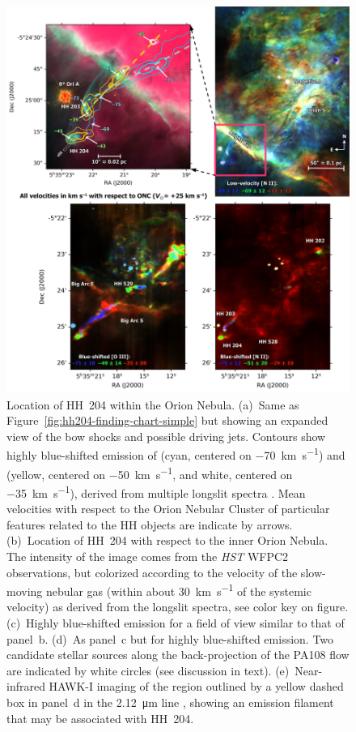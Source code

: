 \documentclass[twocolumn]{aastex63}
\begin{document}
\begin{figure}
  \centering
  \includegraphics[width=\textwidth]{hh204-finding-chart}
  \caption{Location of HH~204 within the Orion Nebula.
    (a)~Same as Figure~\ref{fig:hh204-finding-chart-simple}
    but showing an expanded view of the bow shocks and possible driving jets.
    Contours show highly blue-shifted emission of \oiii{}
    (cyan, centered on \SI{-70}{km.s^{-1}})
    and \nii{}
    (yellow, centered on \SI{-50}{km.s^{-1}}, and white, centered on \SI{-35}{km.s^{-1}}),
    derived from multiple longslit spectra
    \citetext{\citealp{Doi:2004a}
      as recalibrated in spectral atlas of \citealp{Garcia-Diaz:2008a}}.
    Mean velocities with respect to the Orion Nebular Cluster
    of particular features related to the HH objects are indicate by arrows.
    (b)~Location of HH~204 with respect to the inner Orion Nebula.
    The intensity of the image comes from the \nii{} \textit{HST} WFPC2 observations,
    but colorized according to the velocity of the slow-moving nebular gas
    (within about \SI{30}{km.s^{-1}} of the systemic velocity) as derived from the
    longslit spectra, see color key on figure.
    (c)~Highly blue-shifted \oiii{} emission for a field of view similar to that of panel~b.
    (d)~As panel~c but for highly blue-shifted \nii{} emission.
    Two candidate stellar sources along the back-projection of the PA108 flow
    are indicated by white circles (see discussion in text).
    (e)~Near-infrared HAWK-I imaging
    of the region outlined by a yellow dashed box in panel~d
    in the \SI{2.12}{\micro m}  line \citep{Kissler-Patig:2008a},
    showing an emission filament that may be associated with HH~204.
    }
  \label{fig:hh204-finding-chart}
\end{figure}
\end{document}
